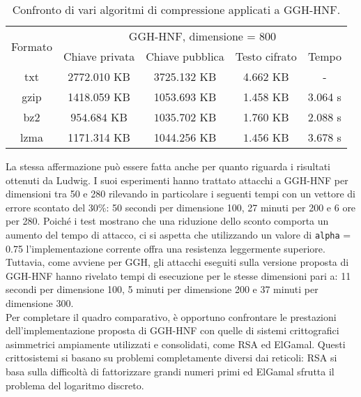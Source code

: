 \begin{table}[H]
    \centering
    \begin{tabular}{|c|c|c|c|c|}
    \hline
    \multirow{2}{*}{Formato} & \multicolumn{4}{c|}{GGH-HNF, dimensione = 800}\\ \cline{2-5} 
     & Chiave privata & Chiave pubblica & Testo cifrato & Tempo \\ \hline
    txt & 2772.010 KB& 3725.132 KB& 4.662 KB& - \\ \hline
    gzip & 1418.059 KB& 1053.693 KB& 1.458 KB& 3.064 s\\ \hline
    bz2 & $\mathbf{954.684}$ KB& $\mathbf{1035.702}$ KB& 1.760 KB& $\mathbf{2.088}$ s\\ \hline
    lzma & 1171.314 KB& 1044.256 KB& $\mathbf{1.456}$ KB& 3.678 s\\ \hline
    \end{tabular}
    \caption{Confronto di vari algoritmi di compressione applicati a GGH-HNF.}
    \label{tab:GGHHNF_compresso}

\end{table}

La stessa affermazione può essere fatta anche per quanto riguarda i risultati ottenuti
da Ludwig. I suoi esperimenti hanno trattato attacchi a GGH-HNF per dimensioni tra 
50 e 280 rilevando in particolare i seguenti tempi con un vettore di errore scontato
del 30\%: 50 secondi per dimensione 100, 27 minuti per 200 e 6 ore per 280. 
Poiché i test mostrano che una riduzione dello sconto comporta un aumento del tempo di 
attacco, ci si aspetta che utilizzando un valore di \texttt{alpha} = 0.75 l'implementazione 
corrente offra una resistenza leggermente superiore. Tuttavia, come avviene per 
GGH, gli attacchi eseguiti sulla versione proposta di GGH-HNF hanno rivelato tempi di 
esecuzione per le stesse dimensioni pari a: 11 secondi per dimensione 100, 5 minuti per 
dimensione 200 e 37 minuti per dimensione 300.\\
Per completare il quadro comparativo, è opportuno confrontare le prestazioni 
dell'implementazione proposta di GGH-HNF con quelle di sistemi crittografici asimmetrici 
ampiamente utilizzati e consolidati, come RSA ed ElGamal. Questi crittosistemi si basano
su problemi completamente diversi dai reticoli: RSA si basa sulla difficoltà di fattorizzare 
grandi numeri primi ed ElGamal sfrutta il problema del logaritmo discreto.

